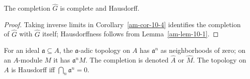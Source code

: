 \begin{proposition}
\label{am-prop-10-5}
\uses{}
The completion $\widehat G$ is complete and Hausdorff.
\end{proposition}
\begin{proof}
Taking inverse limits in Corollary~\ref{am-cor-10-4} identifies the completion
of $\widehat G$ with $\widehat G$ itself; Hausdorffness follows from
Lemma~\ref{am-lem-10-1}.
\end{proof}
\begin{definition}
\label{am-def-adic-completion}
\uses{}
For an ideal $\mathfrak{a}\subseteq A$, the $\mathfrak{a}$-adic topology on $A$ has
$\mathfrak{a}^n$ as neighborhoods of zero; on an $A$-module $M$ it has
$\mathfrak{a}^nM$.  The completion is denoted $\widehat A$ or $\widehat M$.
The topology on $A$ is Hausdorff iff $\bigcap_n\mathfrak{a}^n=0$.
\end{definition}

